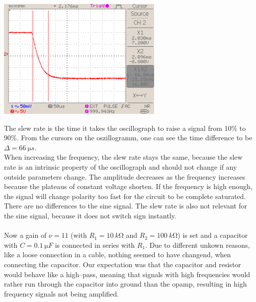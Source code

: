 \documentclass[a4paper,10pt]{article}
\newenvironment{Figure}
        {\par\medskip\noindent\minipage{\linewidth}}
        {\endminipage\par\medskip}
\numberwithin{equation}{section}
\begin{document}
\begin{multicols}{2}
\begin{Figure}
                \includegraphics[width=0.6\textwidth]{../data/DS0026_negate.png}
        \end{Figure}
        \noindent The slew rate is the time it takes the oscillograph to raise a signal from 10\% to 90\%.
        From the cursors on the oszillogramm, one can see the time difference to be $\Delta =\SI{66}{\micro s}$.
        \\\indent When increasing the frequency, the slew rate stays the same, because the slew rate is an intrinsic property of the oscillograph and should not change if any outside parameters change.
        The amplitude decreases as the frequency increases because the plateaus of constant voltage shorten.
        If the frequency is high enough, the signal will change polarity too fast for the circuit to be complete saturated.
        There are no differences to the sine signal.
        The slew rate is also not relevant for the sine signal, because it does not switch sign instantly.
        \\\\ Now a gain of $\nu =11$ (with $R_1=\SI{10}{k\ohm}$ and $R_2=\SI{100}{k\ohm}$) is set and a capacitor with $C=\SI{0.1}{\micro F}$ is connected in series with $R_1$.
        Due to different unkown reasons, like a loose connection in a cable, nothing seemed to have changend, when connecting the capacitor.
        Our expectation was that the capacitor and resistor would behave like a high--pass, meaning that signals with high frequencies would rather run through the capacitor into ground than the opamp, resulting in high frequency signals not being amplified.


\end{multicols}
\end{document}
